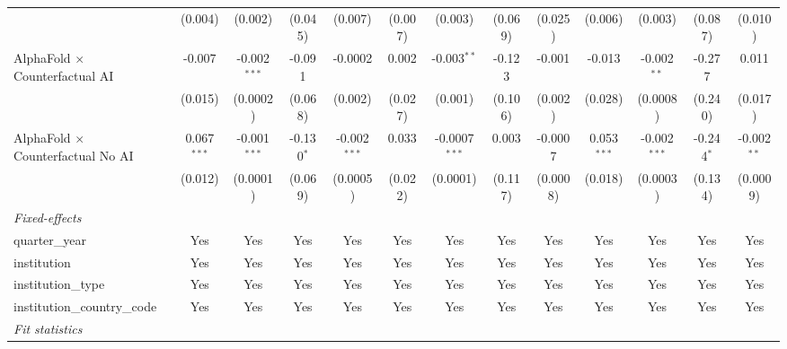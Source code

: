 \begin{tabular}{lcccccccccccc}
                                            & (0.004)       & (0.002)        & (0.045)       & (0.007)        & (0.007)       & (0.003)         & (0.069)      & (0.025)  & (0.006)       & (0.003)        & (0.087)       & (0.010)\\   
   AlphaFold $\times$ Counterfactual AI     & -0.007        & -0.002$^{***}$ & -0.091        & -0.0002        & 0.002         & -0.003$^{**}$   & -0.123       & -0.001   & -0.013        & -0.002$^{**}$  & -0.277        & 0.011\\   
                                            & (0.015)       & (0.0002)       & (0.068)       & (0.002)        & (0.027)       & (0.001)         & (0.106)      & (0.002)  & (0.028)       & (0.0008)       & (0.240)       & (0.017)\\   
   AlphaFold $\times$ Counterfactual No AI  & 0.067$^{***}$ & -0.001$^{***}$ & -0.130$^{*}$  & -0.002$^{***}$ & 0.033         & -0.0007$^{***}$ & 0.003        & -0.0007  & 0.053$^{***}$ & -0.002$^{***}$ & -0.244$^{*}$  & -0.002$^{**}$\\   
                                            & (0.012)       & (0.0001)       & (0.069)       & (0.0005)       & (0.022)       & (0.0001)        & (0.117)      & (0.0008) & (0.018)       & (0.0003)       & (0.134)       & (0.0009)\\   
   \midrule
   \emph{Fixed-effects}\\
   quarter\_year                            & Yes           & Yes            & Yes           & Yes            & Yes           & Yes             & Yes          & Yes      & Yes           & Yes            & Yes           & Yes\\  
   institution                              & Yes           & Yes            & Yes           & Yes            & Yes           & Yes             & Yes          & Yes      & Yes           & Yes            & Yes           & Yes\\  
   institution\_type                        & Yes           & Yes            & Yes           & Yes            & Yes           & Yes             & Yes          & Yes      & Yes           & Yes            & Yes           & Yes\\  
   institution\_country\_code               & Yes           & Yes            & Yes           & Yes            & Yes           & Yes             & Yes          & Yes      & Yes           & Yes            & Yes           & Yes\\  
   \midrule
   \emph{Fit statistics}\\

\end{tabular}
